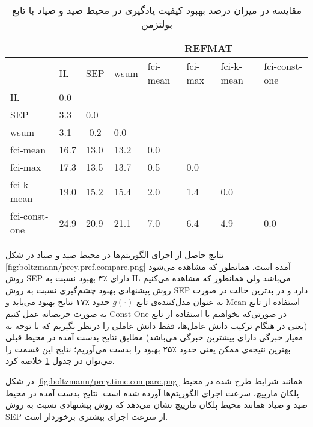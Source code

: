

\begin{table}
\centering
\caption{مقایسه در میزان درصد بهبود کیفیت یادگیری در محیط صید و صیاد با تابع بولتزمن}\label{tab:prey_pref_compare}
\begin{latin}
\begin{tabular}{|*8{l|}}
\hline
\multicolumn{3}{|c|}{}& \multicolumn{5}{c|}{REFMAT}
\\\hline
& IL & SEP & wsum & fci-mean & fci-max & fci-k-mean & fci-const-one
\\\hline
IL &0.0 & & & & & &
\\\hline
SEP &3.3 &0.0 & & & & &
\\\hline
wsum &3.1 &-0.2 &0.0 & & & &
\\\hline
fci-mean &16.7 &13.0 &13.2 &0.0 & & &
\\\hline
fci-max &17.3 &13.5 &13.7 &0.5 &0.0 & &
\\\hline
fci-k-mean &19.0 &15.2 &15.4 &2.0 &1.4 &0.0 &
\\\hline
fci-const-one &24.9 &20.9 &21.1 &7.0 &6.4 &4.9 &0.0
\\\hline
\end{tabular}
\end{latin}
\end{table}

 نتایج حاصل از اجرای الگوریتم‌ها در محیط صید و صیاد در شکل
\ref{fig:boltzmann/prey.pref.compare.png}
آمده است. همانطور که مشاهده می‌شود روش SEP دارای ٪۳ بهبود نسبت به IL می‌باشد ولی همانطور که مشاهده می‌کنیم روش پیشنهادی بهبود چشم‌گیری نسبت به روش SEP دارد و در بدترین حالت در صورت استفاده از تابع $\text{Mean}$ به عنوان مدل‌کننده‌ی تابع $g(\cdot)$ حدود ٪۱۷ نتایج بهبود می‌یابد و در صورتی‌که بخواهیم با استفاده از تابع $\text{Const-One}$ به صورت حریصانه عمل کنیم (یعنی در هنگام ترکیب دانش عامل‌ها، فقط دانش عاملی را درنظر بگیریم که با توجه به معیار خبرگی دارای بیشترین خبرگی می‌باشد) مطابق نتایج بدست آمده در محیط قبلی بهترین نتیجه‌ی ممکن یعنی حدود ٪۲۵ بهبود را بدست می‌آوریم؛ نتایج این قسمت را می‌توان در جدول
\ref{tab:prey_pref_compare}
خلاصه کرد.

 در شکل
\ref{fig:boltzmann/prey.time.compare.png}
همانند شرایط طرح شده در محیط پلکان مارپیچ، سرعت اجرای الگوریتم‌ها آورده شده است. نتایج بدست آمده در محیط صید و صیاد همانند محیط پلکان مارپیچ نشان می‌دهد که روش پیشنهادی نسبت به روش SEP از سرعت اجرای بیشتری برخوردار است.

